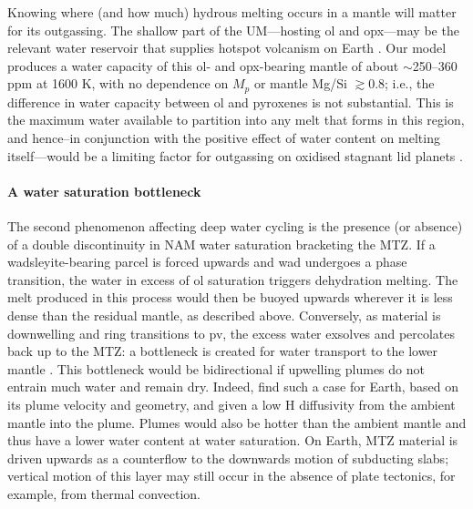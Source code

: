 Knowing where (and how much) hydrous melting occurs in a mantle will matter for its outgassing. The shallow part of the UM---hosting ol and opx---may be the relevant water reservoir that supplies hotspot volcanism on Earth \citep{yang_intraplate_2020}. Our model produces a water capacity of this ol- and opx-bearing mantle of about $\sim$250--360 ppm at 1600 K, with no dependence on $M_p$ or mantle Mg/Si $\gtrsim 0.8$; i.e., the difference in water capacity between ol and pyroxenes is not substantial. This is the maximum water available to partition into any melt that forms in this region, and hence--in conjunction with the positive effect of water content on melting itself---would be a limiting factor for  outgassing on oxidised stagnant lid planets \citep{guimond_low_2021}. 



\paragraph{A water saturation bottleneck}

The second phenomenon affecting deep water cycling is the presence (or absence) of a double discontinuity in NAM water saturation bracketing the MTZ. If a wadsleyite-bearing parcel is forced upwards and wad undergoes a phase transition, the water in excess of ol saturation triggers dehydration melting. The melt produced in this process would then be buoyed upwards wherever it is less dense than the residual mantle, as described above. Conversely, as material is downwelling and ring transitions to pv, the excess water exsolves and percolates back up to the MTZ: a bottleneck is created for water transport to the lower mantle \citep{bercovici_wholemantle_2003}. This bottleneck would be bidirectional if upwelling plumes do not entrain much water and remain dry. Indeed, \citet{bercovici_wholemantle_2003} find such a case for Earth, based on its plume velocity and geometry, and given a low H diffusivity from the ambient mantle into the plume. Plumes would also be hotter than the ambient mantle and thus have a lower water content at water saturation. On Earth, MTZ material is driven upwards as a counterflow to the downwards motion of subducting slabs; vertical motion of this layer may still occur in the absence of plate tectonics, for example, from thermal convection. 
\medskip

